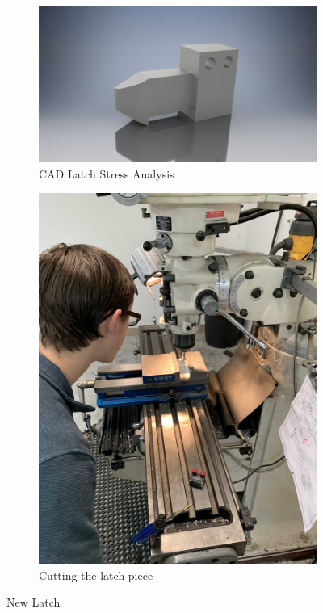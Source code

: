 \documentclass{article}
\begin{document}
\begin{figure}[h!]
\centering
\begin{subfigure}{.5\textwidth}
  \centering
  \includegraphics[width=\textwidth,]{27_03-04/images/latchCAD.png}
  \caption{CAD Latch Stress Analysis}
  \label{fig:Latch}
 \end{subfigure}
\begin{subfigure}{.35\textwidth}
  \centering
  \includegraphics[width=.75\textwidth]{27_03-04/images/thing5.jpg}
  \caption{Cutting the latch piece}
  \label{fig:Latchcut}
  \end{subfigure}
  \caption{New Latch}
  \end{figure}
\end{document}
